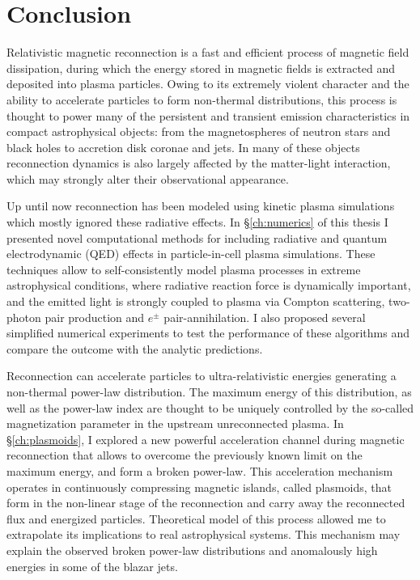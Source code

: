 \chapter{Conclusion}
\label{conclusion}

Relativistic magnetic reconnection is a fast and efficient process of magnetic field dissipation, during which the energy stored in magnetic fields is extracted and deposited into plasma particles. Owing to its extremely violent character and the ability to accelerate particles to form non-thermal distributions, this process is thought to power many of the persistent and transient emission characteristics in compact astrophysical objects: from the magnetospheres of neutron stars and black holes to accretion disk coronae and jets. In many of these objects reconnection dynamics is also largely affected by the matter-light interaction, which may strongly alter their observational appearance. 

Up until now reconnection has been modeled using kinetic plasma simulations which mostly ignored these radiative effects. In \S\ref{ch:numerics} of this thesis I presented novel computational methods for including radiative and quantum electrodynamic (QED) effects in particle-in-cell plasma simulations. These techniques allow to self-consistently model plasma processes in extreme astrophysical conditions, where radiative reaction force is dynamically important, and the emitted light is strongly coupled to plasma via Compton scattering, two-photon pair production and $e^\pm$ pair-annihilation. I also proposed several simplified numerical experiments to test the performance of these algorithms and compare the outcome with the analytic predictions. 

Reconnection can accelerate particles to ultra-relativistic energies generating a non-thermal power-law distribution. The maximum energy of this distribution, as well as the power-law index are thought to be uniquely controlled by the so-called magnetization parameter in the upstream unreconnected plasma. In \S\ref{ch:plasmoids}, I explored a new powerful acceleration channel during magnetic reconnection that allows to overcome the previously known limit on the maximum energy, and form a broken power-law. This acceleration mechanism operates in continuously compressing magnetic islands, called plasmoids, that form in the non-linear stage of the reconnection and carry away the reconnected flux and energized particles. Theoretical model of this process allowed me to extrapolate its implications to real astrophysical systems. This mechanism may explain the observed broken power-law distributions and anomalously high energies in some of the blazar jets.

